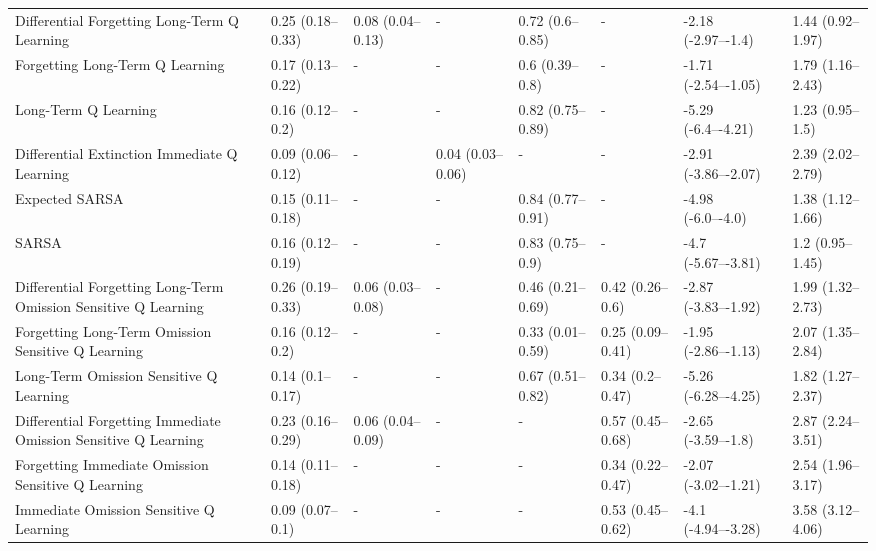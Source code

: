 \begin{tabular}{llllllll}
                    Differential Forgetting Long-Term Q Learning & 0.25 (0.18–0.33) & 0.08 (0.04–0.13) &                - &  0.72 (0.6–0.85) &                - &  -2.18 (-2.97–-1.4) & 1.44 (0.92–1.97) \\
                                 Forgetting Long-Term Q Learning & 0.17 (0.13–0.22) &                - &                - &   0.6 (0.39–0.8) &                - & -1.71 (-2.54–-1.05) & 1.79 (1.16–2.43) \\
                                            Long-Term Q Learning &  0.16 (0.12–0.2) &                - &                - & 0.82 (0.75–0.89) &                - &  -5.29 (-6.4–-4.21) &  1.23 (0.95–1.5) \\
                    Differential Extinction Immediate Q Learning & 0.09 (0.06–0.12) &                - & 0.04 (0.03–0.06) &                - &                - & -2.91 (-3.86–-2.07) & 2.39 (2.02–2.79) \\
                                                  Expected SARSA & 0.15 (0.11–0.18) &                - &                - & 0.84 (0.77–0.91) &                - &   -4.98 (-6.0–-4.0) & 1.38 (1.12–1.66) \\
                                                           SARSA & 0.16 (0.12–0.19) &                - &                - &  0.83 (0.75–0.9) &                - &  -4.7 (-5.67–-3.81) &  1.2 (0.95–1.45) \\
Differential Forgetting Long-Term Omission Sensitive Q Learning  & 0.26 (0.19–0.33) & 0.06 (0.03–0.08) &                - & 0.46 (0.21–0.69) &  0.42 (0.26–0.6) & -2.87 (-3.83–-1.92) & 1.99 (1.32–2.73) \\
             Forgetting Long-Term Omission Sensitive Q Learning  &  0.16 (0.12–0.2) &                - &                - & 0.33 (0.01–0.59) & 0.25 (0.09–0.41) & -1.95 (-2.86–-1.13) & 2.07 (1.35–2.84) \\
                        Long-Term Omission Sensitive Q Learning  &  0.14 (0.1–0.17) &                - &                - & 0.67 (0.51–0.82) &  0.34 (0.2–0.47) & -5.26 (-6.28–-4.25) & 1.82 (1.27–2.37) \\
Differential Forgetting Immediate Omission Sensitive Q Learning  & 0.23 (0.16–0.29) & 0.06 (0.04–0.09) &                - &                - & 0.57 (0.45–0.68) &  -2.65 (-3.59–-1.8) & 2.87 (2.24–3.51) \\
             Forgetting Immediate Omission Sensitive Q Learning  & 0.14 (0.11–0.18) &                - &                - &                - & 0.34 (0.22–0.47) & -2.07 (-3.02–-1.21) & 2.54 (1.96–3.17) \\
                        Immediate Omission Sensitive Q Learning  &  0.09 (0.07–0.1) &                - &                - &                - & 0.53 (0.45–0.62) &  -4.1 (-4.94–-3.28) & 3.58 (3.12–4.06) \\
\bottomrule
\end{tabular}
